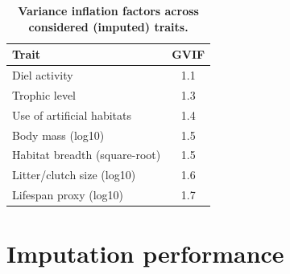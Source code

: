 \begin{table}[h!]
\renewcommand{\baselinestretch}{1}
\renewcommand{\arraystretch}{1.2}
\begin{center}\fontsize{9}{11}\selectfont
\caption[Variance inflation factors across considered (imputed) traits]{\textbf{Variance inflation factors across considered (imputed) traits.}} 
\label{SI3_Table3}  
\begin{tabular}{|l|c|}
\hline
\textbf{Trait}                & \multicolumn{1}{l|}{\textbf{GVIF}} \\ \hline
Diel activity                 & 1.1                                \\ 
Trophic level                 & 1.3                                \\ 
Use of artificial habitats    & 1.4                                \\
Body mass (log10)             & 1.5                                \\ 
Habitat breadth (square-root) & 1.5                                \\ 
Litter/clutch size (log10)    & 1.6                                \\ 
Lifespan proxy (log10)        & 1.7                                \\ \hline
\end{tabular}
\end{center}
\end{table}

\newpage

\section{Imputation performance}

